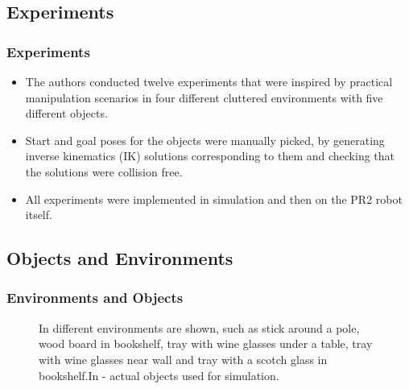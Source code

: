 \documentclass{beamer}
\begin{document}
\subsection{Experiments} 
\begin{frame}
\frametitle{Experiments}
\begin{itemize} 
  \item The authors conducted
twelve experiments that were inspired by practical manipulation
scenarios in four different cluttered environments
with five different objects.
  \item Start and goal poses for the objects were manually picked, 
  by generating
inverse kinematics (IK) solutions corresponding to them and
checking that the solutions were collision free.
\item All experiments were
implemented in simulation and then on the PR2 robot
itself.
 
\end{itemize}
\end{frame}

\subsection{Objects and Environments} 
\begin{frame}
\frametitle{Environments and Objects}
\begin{figure}[]
\centering
{}
\caption[Optional caption for list of figures]{In  different
environments are shown, such as stick around a pole, wood
board in bookshelf, tray with wine glasses under a table, tray
with wine glasses near wall and tray with a scotch glass in
bookshelf.\newline In  - actual objects used for
simulation.}
\label{fig:subfigureEnv}
\end{figure} 
\end{frame}

\begin{frame}
\frametitle{}
\begin{figure}[]
\centering
{}

\label{fig:subfigureExp}
\end{figure} 
\end{frame}
\end{document}
